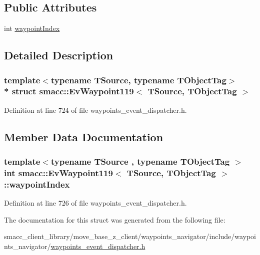\subsection*{Public Attributes}
\begin{DoxyCompactItemize}
\item 
int \hyperlink{structsmacc_1_1EvWaypoint119_a64af9bec461f738b5d1d7cc34ca37adb}{waypoint\+Index}
\end{DoxyCompactItemize}


\subsection{Detailed Description}
\subsubsection*{template$<$typename T\+Source, typename T\+Object\+Tag$>$\\*
struct smacc\+::\+Ev\+Waypoint119$<$ T\+Source, T\+Object\+Tag $>$}



Definition at line 724 of file waypoints\+\_\+event\+\_\+dispatcher.\+h.



\subsection{Member Data Documentation}
\subsubsection[{\texorpdfstring{waypoint\+Index}{waypointIndex}}]{\setlength{\rightskip}{0pt plus 5cm}template$<$typename T\+Source , typename T\+Object\+Tag $>$ int {\bf smacc\+::\+Ev\+Waypoint119}$<$ T\+Source, T\+Object\+Tag $>$\+::waypoint\+Index}\hypertarget{structsmacc_1_1EvWaypoint119_a64af9bec461f738b5d1d7cc34ca37adb}{}\label{structsmacc_1_1EvWaypoint119_a64af9bec461f738b5d1d7cc34ca37adb}


Definition at line 726 of file waypoints\+\_\+event\+\_\+dispatcher.\+h.



The documentation for this struct was generated from the following file\+:\begin{DoxyCompactItemize}
\item 
smacc\+\_\+client\+\_\+library/move\+\_\+base\+\_\+z\+\_\+client/waypoints\+\_\+navigator/include/waypoints\+\_\+navigator/\hyperlink{waypoints__event__dispatcher_8h}{waypoints\+\_\+event\+\_\+dispatcher.\+h}\end{DoxyCompactItemize}
